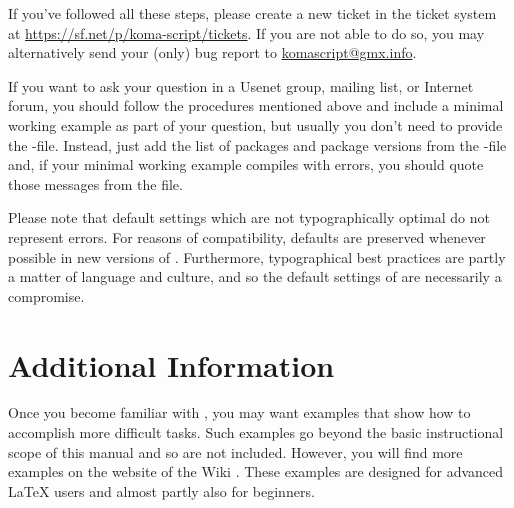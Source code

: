 If you've followed all these steps, please create a new ticket in the
\KOMAScript{} ticket system at \url{https://sf.net/p/koma-script/tickets}. If
you are not able to do so, you may alternatively send your {\KOMAScript}
(only) bug report to \href{mailto:komascript@gmx.info}{komascript@gmx.info}.

If you want to ask your question in a Usenet group, mailing list, or Internet
forum, you should follow the procedures mentioned above and include a minimal
working example as part of your question, but usually you don't need to
provide the -file. Instead, just add the list of packages and
package versions from the -file and, if your minimal working example
compiles with errors, you should quote those messages from the 
file.

Please note that default settings which are not typographically optimal do not
represent errors. For reasons of compatibility, defaults are preserved
whenever possible in new versions of {\KOMAScript}. Furthermore, typographical
best practices are partly a matter of language and culture, and so the default
settings of {\KOMAScript} are necessarily a compromise.

\section{Additional Information}

Once you become familiar with {\KOMAScript}, you may want examples that show
how to accomplish more difficult tasks. Such examples go beyond the basic
instructional scope of this manual and so are not included. However, you will
find more examples on the website of the {\KOMAScript} Wiki
\cite{wiki-en}. These examples are designed for advanced {\LaTeX} users and
almost partly also for beginners.

\endinput
